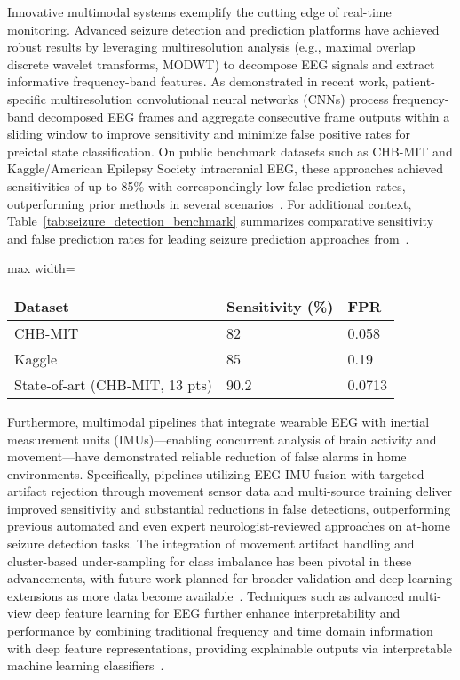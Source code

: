 \documentclass[sigconf]{acmart}
\begin{document}
Innovative multimodal systems exemplify the cutting edge of real-time monitoring. Advanced seizure detection and prediction platforms have achieved robust results by leveraging multiresolution analysis (e.g., maximal overlap discrete wavelet transforms, MODWT) to decompose EEG signals and extract informative frequency-band features. As demonstrated in recent work, patient-specific multiresolution convolutional neural networks (CNNs) process frequency-band decomposed EEG frames and aggregate consecutive frame outputs within a sliding window to improve sensitivity and minimize false positive rates for preictal state classification. On public benchmark datasets such as CHB-MIT and Kaggle/American Epilepsy Society intracranial EEG, these approaches achieved sensitivities of up to 85\% with correspondingly low false prediction rates, outperforming prior methods in several scenarios~\cite{ref102}. For additional context, Table~\ref{tab:seizure_detection_benchmark} summarizes comparative sensitivity and false prediction rates for leading seizure prediction approaches from~\cite{ref102}.

\begin{table*}[htbp]
\centering
\caption{Benchmark Sensitivity (\%) and False Prediction Rate (FPR) for Seizure Prediction Approaches}
\label{tab:seizure_detection_benchmark}
\begin{adjustbox}{max width=\textwidth}
\begin{tabular}{@{}lll@{}}
\toprule
Dataset & Sensitivity (\%) & FPR \\
\midrule
CHB-MIT & 82 & 0.058 \\
Kaggle & 85 & 0.19 \\
State-of-art (CHB-MIT, 13 pts) & 90.2 & 0.0713 \\
\bottomrule
\end{tabular}
\end{adjustbox}
\end{table*}

Furthermore, multimodal pipelines that integrate wearable EEG with inertial measurement units (IMUs)—enabling concurrent analysis of brain activity and movement—have demonstrated reliable reduction of false alarms in home environments. Specifically, pipelines utilizing EEG-IMU fusion with targeted artifact rejection through movement sensor data and multi-source training deliver improved sensitivity and substantial reductions in false detections, outperforming previous automated and even expert neurologist-reviewed approaches on at-home seizure detection tasks. The integration of movement artifact handling and cluster-based under-sampling for class imbalance has been pivotal in these advancements, with future work planned for broader validation and deep learning extensions as more data become available~\cite{ref103}. Techniques such as advanced multi-view deep feature learning for EEG further enhance interpretability and performance by combining traditional frequency and time domain information with deep feature representations, providing explainable outputs via interpretable machine learning classifiers~\cite{ref98}.
\end{document}
